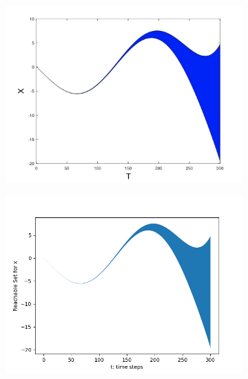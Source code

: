 \documentclass[EPiC]{easychair}
\begin{document}
\begin{figure}[h]
    \hspace{-15ex}
    \begin{subfigure}{0.6\textwidth}
    \centering
    \includegraphics[width=\textwidth]{SapoFigures/Rosslert/SapoRosslerX.jpg}
    \end{subfigure}
    \begin{subfigure}{0.6\textwidth}
    \centering
    \includegraphics[width=1.1\textwidth]{SapoFigures/Rosslert/KaaRosslerX.png}
    \end{subfigure}
  

\end{figure}
\end{document}
